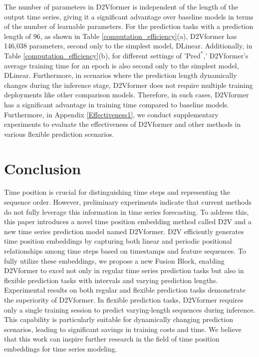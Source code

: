 \documentclass{article}
\begin{document}
The number of parameters in D2Vformer is independent of the length of the output time series, giving it a significant advantage over baseline models in terms of the number of learnable parameters. For the prediction tasks with a prediction length of 96, as shown in Table \ref{computation_efficiency}(a), D2Vformer has 146,038 parameters, second only to the simplest model, DLinear.
Additionally, in Table \ref{computation_efficiency}(b), for different settings of '$\text{Pred}^*$,' D2Vformer's average training time for an epoch is also second only to the simplest model, DLinear. Furthermore, in scenarios where the prediction length dynamically changes during the inference stage, D2Vformer does not require multiple training deployments like other comparison models. Therefore, in such cases, D2Vformer has a significant advantage in training time compared to baseline models.
Furthermore, in Appendix \ref{Effectiveness1}, we conduct supplementary experiments to evaluate the effectiveness of D2Vformer and other methods in various flexible prediction scenarios.

\section{Conclusion}
Time position is crucial for distinguishing time steps and representing the sequence order. However, preliminary experiments indicate that current methods do not fully leverage this information in time series forecasting. To address this, this paper introduces a novel time position embedding method called D2V and a new time series prediction model named D2Vformer.
D2V efficiently generates time position embeddings by capturing both linear and periodic positional relationships among time steps based on timestamps and feature sequences. To fully utilize these embeddings, we propose a new Fusion Block, enabling D2Vformer to excel not only in regular time series prediction tasks but also in flexible prediction tasks with intervals and varying prediction lengths. Experimental results on both regular and flexible prediction tasks demonstrate the superiority of D2Vformer.
In flexible prediction tasks, D2Vformer requires only a single training session to predict varying-length sequences during inference. This capability is particularly suitable for dynamically changing prediction scenarios, leading to significant savings in training costs and time. We believe that this work can inspire further research in the field of time position embeddings for time series modeling.
\end{document}
